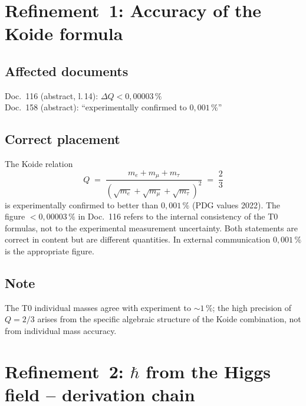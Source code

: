 \section{Refinement~1: Accuracy of the Koide formula}

\subsection*{Affected documents}

Doc.~116 (abstract, l.\,14): $\Delta Q < 0{,}00003\,\%$ \\
Doc.~158 (abstract): ``experimentally confirmed to $0{,}001\,\%$''

\subsection*{Correct placement}

The Koide relation
\begin{equation}
  Q \;=\; \frac{m_e + m_\mu + m_\tau}
               {(\sqrt{m_e}+\sqrt{m_\mu}+\sqrt{m_\tau})^2}
  \;=\; \frac{2}{3}
  \tag{190.7}
\end{equation}
is experimentally confirmed to better than $0{,}001\,\%$ (PDG values 2022). The
figure $< 0{,}00003\,\%$ in Doc.~116 refers to the internal consistency of the
T0 formulas, not to the experimental measurement uncertainty. Both statements
are correct in content but are different quantities. In external communication
$0{,}001\,\%$ is the appropriate figure.

\subsection*{Note}

The T0 individual masses agree with experiment to $\sim 1\,\%$; the high
precision of $Q = 2/3$ arises from the specific algebraic structure of the
Koide combination, not from individual mass accuracy.

\section{\texorpdfstring{Refinement~2: $\hbar$ from the Higgs field -- derivation chain}{Refinement 2: hbar from the Higgs field -- derivation chain}}

